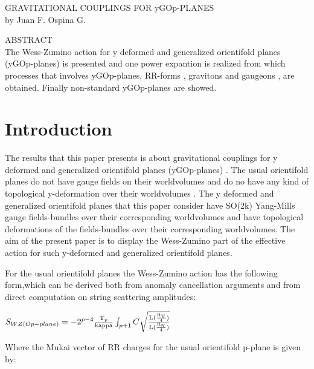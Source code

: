 \documentclass[a4paper,a4paper]{article}
\begin{document}
\begin{center}
GRAVITATIONAL COUPLINGS FOR yGOp-PLANES  \\ [.25in]
by Juan F. Ospina G.
\end{center}
\begin{center}
ABSTRACT \\ [.25in]
The Wess-Zumino action for y deformed and generalized orientifold planes (yGOp-planes)  is presented and  one power expantion is realized from which processes that involves yGOp-planes, RR-forms , gravitons and gaugeons , are obtained. Finally non-standard yGOp-planes  are showed.
\end{center}

\section{Introduction}
The results that this paper presents is about gravitational couplings for y deformed and generalized orientifold planes (yGOp-planes) . The usual orientifold planes do not have gauge fields on their worldvolumes and do no have any kind of topological y-deformation over their worldvolumes . The y deformed and generalized orientifold planes that this paper consider have SO(2k) Yang-Mills gauge fields-bundles over their corresponding worldvolumes and have topological deformations of the fields-bundles over their corresponding worldvolumes. The aim of the present paper is to display the Wess-Zumino part of the effective action for such y-deformed and  generalized orientifold planes.



For the usual orientifold planes the Wess-Zumino action has the following form,which can be derived both from anomaly cancellation arguments and from
direct computation on string scattering amplitudes:   

\begin{center}
{  $ S_{WZ(Op-plane)} = -2^{p-4}\frac{\rm T_p}{\rm kappa}\int_{p+1} C\sqrt{\frac{\rm L(\frac{\rm R_T}{\rm 4})}{\rm L(\frac{\rm R_N}{\rm 4})}}$ }
\end{center}

Where the Mukai vector of RR charges for the usual orientifold p-plane is given by:
\end{document}
